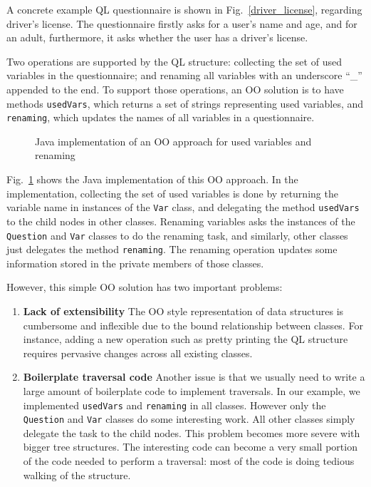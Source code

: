 A concrete example QL questionnaire is shown in Fig.~\ref{driver_license}, regarding driver's license. The questionnaire firstly asks for a user's name and age, and for an adult, furthermore, it asks whether the user has a driver's license.

Two operations are supported by the QL structure: collecting the set of used variables in the questionnaire; and renaming all variables with an underscore ``\_'' appended to the end. To support those operations, an OO solution is to have methods \lstinline{usedVars}, which returns a set of strings representing used variables, and \lstinline{renaming}, which updates the names of all variables in a questionnaire.

\begin{figure}[t]
\nocaptionrule
\caption{Java implementation of an OO approach for used variables and renaming}
\label{ql_oo_approach}
\end{figure}

Fig.~\ref{ql_oo_approach} shows the Java implementation of this OO approach. In the implementation, collecting the set of used variables is done by returning the variable name in instances of the \lstinline{Var} class, and delegating the method \lstinline{usedVars} to the child nodes in other classes. Renaming variables asks the instances of the \lstinline{Question} and \lstinline{Var} classes to do the renaming task, and similarly, other classes just delegates the method \lstinline{renaming}. The renaming operation updates some information stored in the private members of those classes.

However, this simple OO solution has two important problems:

\begin{enumerate}

\item {\bf Lack of extensibility} The OO style
  representation of data structures is cumbersome and
  inflexible due to the bound relationship between classes. For
  instance, adding a new operation such as pretty
  printing the QL structure requires pervasive changes across all
  existing classes.

\item {\bf Boilerplate traversal code} Another issue is that we
  usually need to write a large amount of boilerplate code to
  implement traversals. In our example, we implemented
  \lstinline{usedVars} and \lstinline{renaming} in all
  classes. However only the \lstinline{Question} and \lstinline{Var} classes do some
  interesting work. All other classes simply delegate the task to the
  child nodes. This problem becomes more severe with bigger tree
  structures. The interesting code can become a very small portion of
  the code needed to perform a traversal: most of the code is doing
  tedious walking of the structure.

\end{enumerate}

